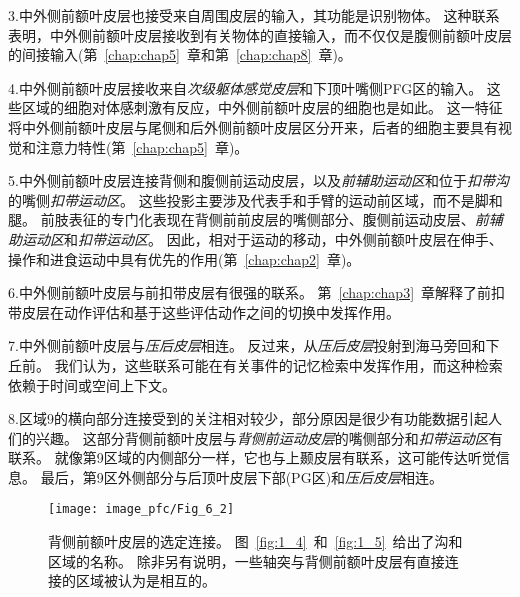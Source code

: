 3.中外侧前额叶皮层也接受来自周围皮层的输入\cite{petrides1999dorsolateral}，其功能是识别物体\cite{murray2007orbitofrontal}。
这种联系表明，中外侧前额叶皮层接收到有关物体的直接输入，而不仅仅是腹侧前额叶皮层的间接输入(第~\ref{chap:chap5}~章和第~\ref{chap:chap8}~章)。
\par


4.中外侧前额叶皮层接收来自\textit{次级躯体感觉皮层}\cite{petrides2002comparative}和下顶叶嘴侧PFG区\cite{rozzi2006cortical}的输入。
这些区域的细胞对体感刺激有反应\cite{hyva1981regional}，中外侧前额叶皮层的细胞也是如此\cite{tanila1993regional}。
这一特征将中外侧前额叶皮层与尾侧和后外侧前额叶皮层区分开来，后者的细胞主要具有视觉和注意力特性(第~\ref{chap:chap5}~章)。
\par


5.中外侧前额叶皮层连接背侧和腹侧前运动皮层\cite{wang2002spatial}，以及\textit{前辅助运动区}\cite{wang2005prefrontal}和位于\textit{扣带沟}的嘴侧\textit{扣带运动区}\cite{dum1993cingulate}。
这些投影主要涉及代表手和手臂的运动前区域，而不是脚和腿。
前肢表征的专门化表现在背侧前前皮层的嘴侧部分\cite{tachibana2004input}、腹侧前运动皮层\cite{he1993topographic}、\textit{前辅助运动区}\cite{luppino1991multiple}和\textit{扣带运动区}\cite{he1995topographic}。
因此，相对于运动的移动，中外侧前额叶皮层在伸手、操作和进食运动中具有优先的作用(第~\ref{chap:chap2}~章)。
\par


6.中外侧前额叶皮层与前扣带皮层有很强的联系\cite{petrides1999dorsolateral}。
第~\ref{chap:chap3}~章解释了前扣带皮层在动作评估和基于这些评估动作之间的切换中发挥作用\cite{walton2007adaptive}。
\par


7.中外侧前额叶皮层与\textit{压后皮层}相连\cite{morris1999fiber}。
反过来，从\textit{压后皮层}投射到海马旁回和下丘前\cite{kobayashi2007macaque}。
我们认为，这些联系可能在有关事件的记忆检索中发挥作用，而这种检索依赖于时间或空间上下文\cite{vann2009does}。
\par


8.区域9的横向部分连接受到的关注相对较少，部分原因是很少有功能数据引起人们的兴趣。
这部分背侧前额叶皮层与\textit{背侧前运动皮层}的嘴侧部分\cite{petrides1999dorsolateral}和\textit{扣带运动区}\cite{morecraft1993frontal}有联系。
就像第9区域的内侧部分一样，它也与上颞皮层有联系，这可能传达听觉信息\cite{petrides1984projections,saleem2008complementary}。
最后，第9区外侧部分与后顶叶皮层下部(PG区)\cite{cavada1989posterior}和\textit{压后皮层}\cite{kobayashi2003macaque}相连。


\begin{figure}
	\centering
	\texttt{[image: image\_pfc/Fig\_6\_2]}
	\caption{背侧前额叶皮层的选定连接。
		图~\ref{fig:1_4}~和~\ref{fig:1_5}~给出了沟和区域的名称。
		除非另有说明，一些轴突与背侧前额叶皮层有直接连接的区域被认为是相互的。}
	\label{fig:6_2}
\end{figure}



